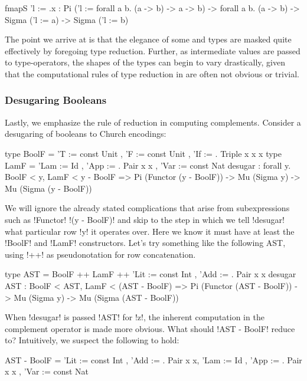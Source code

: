 \documentclass[authoryear, acmsmall, screen, review, nonacm]{acmart} %
\begin{document}
\begin{rosi}
fmapS {'l := \x.x} : 
        Pi ({'l := forall a b. (a -> b) -> a -> b}) -> 
        forall a b. (a -> b) -> Sigma ({'l := a}) -> Sigma ({'l := b})
\end{rosi}

The point we arrive at is that the elegance of some \RO and \Rome types are masked quite effectively by foregoing type reduction. Further, as intermediate  values are passed to type-operators, the shapes of the types can begin to vary drastically, given that the computational rules of type reduction in \Rome are often not obvious or trivial.


\subsubsection{Desugaring Booleans}
Lastly, we emphasize the rule of reduction in computing complements. Consider a desugaring of booleans to Church encodings:

\begin{rosi}
type BoolF = { 'T := const Unit , 'F := const Unit , 'If := \x. Triple x x x}
type LamF  = { 'Lam := Id , 'App := \x. Pair x x , 'Var := const Nat }
desugar : forall y. BoolF < y, LamF < y - BoolF =>
          Pi (Functor (y - BoolF)) -> Mu (Sigma y) -> Mu (Sigma (y - BoolF))
\end{rosi}

We will ignore the already stated complications that arise from subexpressions such as !Functor! !(y - BoolF)! and skip to the step in which we tell !desugar! what particular row !y! it operates over. Here we know it must have at least the !BoolF! and !LamF! constructors. Let's try something like the following AST, using !++! as pseudonotation for row concatenation.

\begin{rosi}
type AST = BoolF ++ LamF ++ {'Lit := const Int , 'Add := \x. Pair x x }
desugar AST : BoolF < AST, LamF < (AST - BoolF) =>
              Pi (Functor (AST - BoolF)) -> Mu (Sigma y) -> Mu (Sigma (AST - BoolF))
\end{rosi}

\Ni When !desugar! is passed !AST! for !z!, the inherent computation in the complement operator is made more obvious. What should !AST - BoolF! reduce to? Intuitively, we suspect the following to hold: 

\begin{rosi} 
AST - BoolF = {'Lit := const Int , 'Add := \x. Pair x x, 
               'Lam := Id , 'App := \x. Pair x x , 'Var := const Nat }
\end{rosi}
\end{document}
